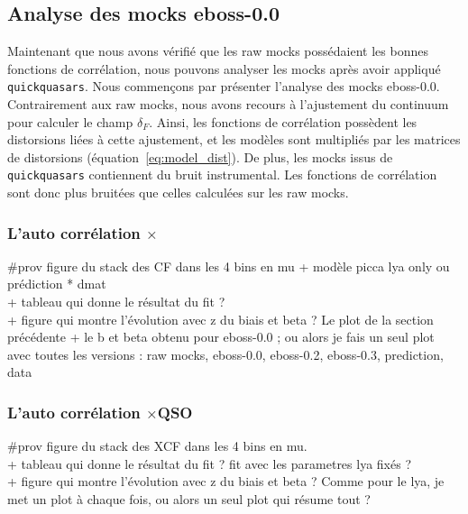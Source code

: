 \documentclass[11pt, twoside, a4paper, openright]{report}
\begin{document}
\subsection{Analyse des mocks eboss-0.0}
Maintenant que nous avons vérifié que les raw mocks possédaient les bonnes fonctions de corrélation, nous pouvons analyser les mocks après avoir appliqué \texttt{quickquasars}.
Nous commençons par présenter l'analyse des mocks eboss-0.0.
Contrairement aux raw mocks, nous avons recours à l'ajustement du continuum pour calculer le champ $\delta_F$. Ainsi, les fonctions de corrélation possèdent les distorsions liées à cette ajustement, et les modèles sont multipliés par les matrices de distorsions (équation~\ref{eq:model_dist}). De plus, les mocks issus de \texttt{quickquasars} contiennent du bruit instrumental. Les fonctions de corrélation sont donc plus bruitées que celles calculées sur les raw mocks.


\subsubsection{L'auto corrélation \lya{}$\times$\lya{}}
\#prov figure du stack des CF dans les 4 bins en mu + modèle picca lya only ou prédiction * dmat \\
+ tableau qui donne le résultat du fit ? \\
+ figure qui montre l'évolution avec z du biais et beta ? Le plot de la section précédente + le b et beta obtenu pour eboss-0.0 ; ou alors je fais un seul plot avec toutes les versions : raw mocks, eboss-0.0, eboss-0.2, eboss-0.3, prediction, data


\subsubsection{L'auto corrélation \lya{}$\times$QSO}
\#prov figure du stack des XCF dans les 4 bins en mu. \\
+ tableau qui donne le résultat du fit ? fit avec les parametres lya fixés ?\\ 
+ figure qui montre l'évolution avec z du biais et beta ? Comme pour le lya, je met un plot à chaque fois, ou alors un seul plot qui résume tout ?
\end{document}
